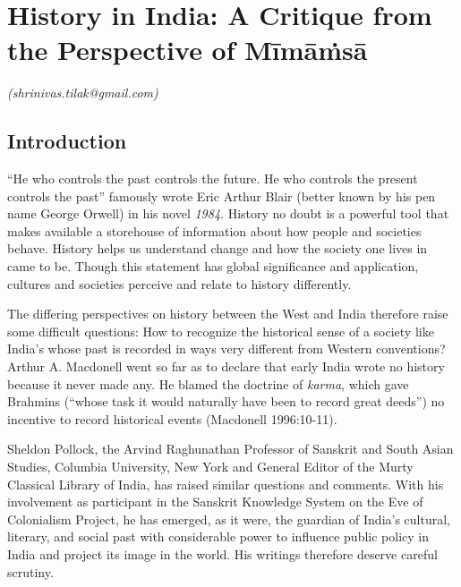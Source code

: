 \chapter{History in India: A Critique from the Perspective of Mīmāṁsā}\label{chapter2}


\begin{flushright}
\textit{\sf\em (shrinivas.tilak@gmail.com)}
\end{flushright}

\section*{Introduction}

“He who controls the past controls the future. He who controls the present controls the past” famously wrote Eric Arthur Blair (better known by his pen name George Orwell) in his novel \textit{1984}. History no doubt is a powerful tool that makes available a storehouse of information about how people and societies behave. History helps us understand change and how the society one lives in came to be. Though this statement has global significance and application, cultures and societies perceive and relate to history differently.

The differing perspectives on history between the West and India therefore raise some difficult questions: How to recognize the historical sense of a society like India’s whose past is recorded in ways very different from Western conventions? Arthur A. Macdonell went so far as to declare that early India wrote no history because it never made any. He blamed the doctrine of \textit{karma}, which gave Brahmins (“whose task it would naturally have been to record great deeds”) no incentive to record historical events (Macdonell 1996:10-11).

Sheldon Pollock, the Arvind Raghunathan Professor of Sanskrit and South Asian Studies, Columbia University, New York and General Editor of the Murty Classical Library of India, has raised similar questions and comments. With his involvement as participant in the Sanskrit Knowledge System on the Eve of Colonialism Project, he has emerged, as it were, the guardian of India’s cultural, literary, and social past with considerable power to influence public policy in India and project its image in the world. His writings therefore deserve careful scrutiny.

